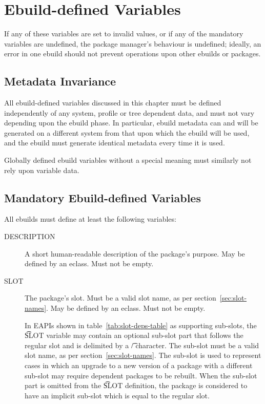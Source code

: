 \chapter{Ebuild-defined Variables}
\label{sec:ebuild-vars}


If any of these variables are set to invalid values, or if any of the mandatory variables are
undefined, the package manager's behaviour is undefined; ideally, an error in one ebuild should not
prevent operations upon other ebuilds or packages.

\section{Metadata Invariance}
\label{sec:metadata-invariance}

All ebuild-defined variables discussed in this chapter must be defined independently of
any system, profile or tree dependent data, and must not vary depending upon the ebuild
phase. In particular, ebuild metadata can and will be generated on a different system from that upon
which the ebuild will be used, and the ebuild must generate identical metadata every time it
is used.

Globally defined ebuild variables without a special meaning must similarly not rely upon
variable data.

\section{Mandatory Ebuild-defined Variables}
\label{sec:mandatory-vars}

All ebuilds must define at least the following variables:

\begin{description}
\item[DESCRIPTION] A short human-readable description of the package's purpose. May be defined by an
    eclass. Must not be empty.
\item[SLOT] The package's slot. Must be a valid slot name, as per section~\ref{sec:slot-names}.
    May be defined by an eclass. Must not be empty.

    In EAPIs shown in table~\ref{tab:slot-deps-table} as supporting sub-slots, the \t{SLOT} variable
    may contain an optional sub-slot part that follows the regular slot and is delimited by a \t{/}
    character. The sub-slot must be a valid slot name, as per section~\ref{sec:slot-names}.
    The sub-slot is used to represent cases in which an upgrade to a new version of a package with
    a different sub-slot may require dependent packages to be rebuilt. When the sub-slot part is
    omitted from the \t{SLOT} definition, the package is considered to have an implicit sub-slot
    which is equal to the regular slot.
\end{description}

